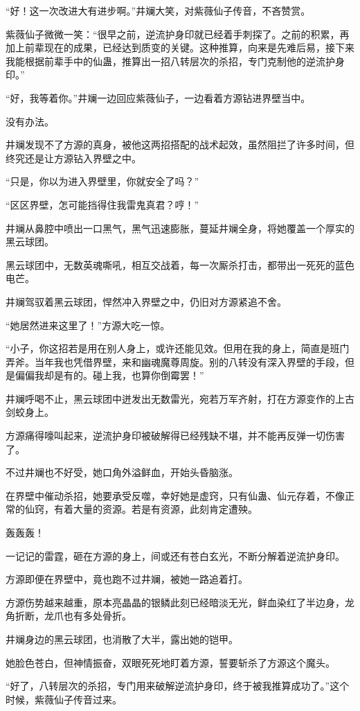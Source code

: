 \begin{this_body}
“好！这一次改进大有进步啊。”井斓大笑，对紫薇仙子传音，不吝赞赏。

紫薇仙子微微一笑：“很早之前，逆流护身印就已经着手刺探了。之前的积累，再加上前辈现在的成果，已经达到质变的关键。这种推算，向来是先难后易，接下来我能根据前辈手中的仙蛊，推算出一招八转层次的杀招，专门克制他的逆流护身印。”

“好，我等着你。”井斓一边回应紫薇仙子，一边看着方源钻进界壁当中。

没有办法。

井斓发现不了方源的真身，被他这两招搭配的战术起效，虽然阻拦了许多时间，但终究还是让方源钻入界壁之中。

“只是，你以为进入界壁里，你就安全了吗？”

“区区界壁，怎可能挡得住我雷鬼真君？哼！”

井斓从鼻腔中喷出一口黑气，黑气迅速膨胀，蔓延井斓全身，将她覆盖一个厚实的黑云球团。

黑云球团中，无数英魂嘶吼，相互交战着，每一次厮杀打击，都带出一死死的蓝色电芒。

井斓驾驭着黑云球团，悍然冲入界壁之中，仍旧对方源紧追不舍。

“她居然进来这里了！”方源大吃一惊。

“小子，你这招若是用在别人身上，或许还能见效。但用在我的身上，简直是班门弄斧。当年我也凭借界壁，来和幽魂魔尊周旋。别的八转没有深入界壁的手段，但是偏偏我却是有的。碰上我，也算你倒霉罢！”

井斓呼喝不止，黑云球团中迸发出无数雷光，宛若万军齐射，打在方源变作的上古剑蛟身上。

方源痛得嚎叫起来，逆流护身印被破解得已经残缺不堪，并不能再反弹一切伤害了。

不过井斓也不好受，她口角外溢鲜血，开始头昏脑涨。

在界壁中催动杀招，她要承受反噬，幸好她是虚窍，只有仙蛊、仙元存着，不像正常的仙窍，有着大量的资源。若是有资源，此刻肯定遭殃。

轰轰轰！

一记记的雷霆，砸在方源的身上，间或还有苍白玄光，不断分解着逆流护身印。

方源即便在界壁中，竟也跑不过井斓，被她一路追着打。

方源伤势越来越重，原本亮晶晶的银鳞此刻已经暗淡无光，鲜血染红了半边身，龙角折断，龙爪也有多处骨折。

井斓身边的黑云球团，也消散了大半，露出她的铠甲。

她脸色苍白，但神情振奋，双眼死死地盯着方源，誓要斩杀了方源这个魔头。

“好了，八转层次的杀招，专门用来破解逆流护身印，终于被我推算成功了。”这个时候，紫薇仙子传音过来。


\end{this_body}
